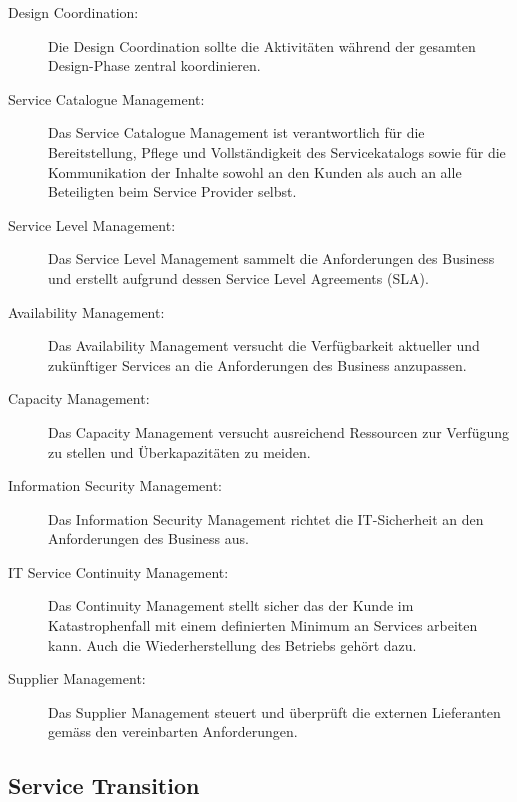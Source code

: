 \begin{description}
	\item[Design Coordination:] Die Design Coordination sollte die Aktivitäten während der gesamten Design-Phase zentral koordinieren.
	\item[Service Catalogue Management:] Das Service Catalogue Management ist verantwortlich für die Bereitstellung, Pflege und Vollständigkeit des Servicekatalogs sowie für die Kommunikation der Inhalte	sowohl an den Kunden als auch an alle Beteiligten beim Service Provider selbst.
	\item[Service Level Management:] Das Service Level Management sammelt die Anforderungen des Business und erstellt aufgrund dessen Service Level Agreements (SLA).
	\item[Availability Management:] Das Availability Management versucht die Verfügbarkeit aktueller und zukünftiger Services an die Anforderungen des Business anzupassen.
	\item[Capacity Management:] Das Capacity Management versucht ausreichend Ressourcen zur Verfügung zu stellen und Überkapazitäten zu meiden.
	\item[Information Security Management:] Das Information Security Management richtet die IT-Sicherheit an den Anforderungen des Business aus.
	\item[IT Service Continuity Management:] Das Continuity Management stellt sicher das der Kunde im Katastrophenfall mit einem definierten Minimum an Services arbeiten kann. Auch die Wiederherstellung des Betriebs gehört dazu.
	\item[Supplier Management:] Das Supplier Management steuert und überprüft die externen Lieferanten gemäss den vereinbarten Anforderungen.
\end{description}

\subsection{Service Transition}

